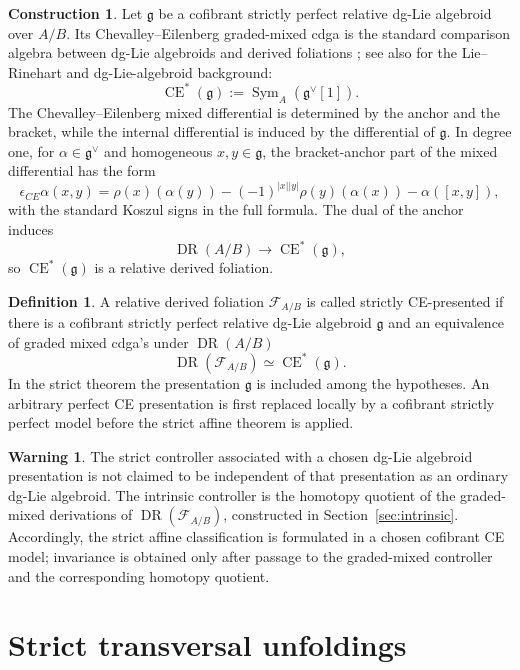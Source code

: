\documentclass[11pt,reqno,a4paper,dvipsnames,x11names]{amsart}
\numberwithin{equation}{section}
\theoremstyle{plain}
\theoremstyle{definition}
\newtheorem{definition}[theorem]{Definition}
\newtheorem{construction}[theorem]{Construction}
\newtheorem{warning}[theorem]{Warning}
\theoremstyle{remark}
\DeclareMathOperator{\Sym}{Sym}
\DeclareMathOperator{\CE}{CE}
\DeclareMathOperator{\DR}{DR}
\newcommand{\cF}{\mathcal F}
\newcommand{\g}{\mathfrak g}
\begin{document}
\begin{construction}
Let \(\g\) be a cofibrant strictly perfect relative dg-Lie algebroid over \(A/B\). Its Chevalley--Eilenberg graded-mixed cdga is the standard comparison algebra between dg-Lie algebroids and derived foliations \cite[Section~2.2]{TV}; see also \cite{Rinehart63,Nuiten} for the Lie--Rinehart and dg-Lie-algebroid background:
\[
 \CE^*(\g):=\Sym_A(\g^\vee[1]).
\]
The Chevalley--Eilenberg mixed differential is determined by the anchor and the bracket, while the internal differential is induced by the differential of \(\g\). In degree one, for \(\alpha\in\g^\vee\) and homogeneous \(x,y\in\g\), the bracket-anchor part of the mixed differential has the form
\[
 \epsilon_{CE}\alpha(x,y)=
 \rho(x)(\alpha(y))
 -(-1)^{|x||y|}\rho(y)(\alpha(x))
 -\alpha([x,y]),
\]
with the standard Koszul signs in the full formula. The dual of the anchor induces
\[
 \DR(A/B)\longrightarrow \CE^*(\g),
\]
so \(\CE^*(\g)\) is a relative derived foliation.
\end{construction}

\begin{definition}
A relative derived foliation \(\cF_{A/B}\) is called strictly CE-presented if there is a cofibrant strictly perfect relative dg-Lie algebroid \(\g\) and an equivalence of graded mixed cdga's under \(\DR(A/B)\)
\[
 \DR(\cF_{A/B})\simeq\CE^*(\g).
\]
In the strict theorem the presentation \(\g\) is included among the hypotheses. An arbitrary perfect CE presentation is first replaced locally by a cofibrant strictly perfect model before the strict affine theorem is applied.
\end{definition}

\begin{warning}
The strict controller associated with a chosen dg-Lie algebroid presentation is not claimed to be independent of that presentation as an ordinary dg-Lie algebroid. The intrinsic controller is the homotopy quotient of the graded-mixed derivations of \(\DR(\cF_{A/B})\), constructed in Section~\ref{sec:intrinsic}. Accordingly, the strict affine classification is formulated in a chosen cofibrant CE model; invariance is obtained only after passage to the graded-mixed controller and the corresponding homotopy quotient.
\end{warning}

\section{Strict transversal unfoldings}
\end{document}
